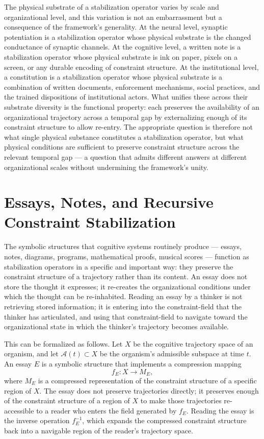 \documentclass[12pt,a4paper]{report}
\theoremstyle{flyxion}
\begin{document}
The physical substrate of a stabilization operator varies by scale and organizational level, and this variation is not an embarrassment but a consequence of the framework's generality. At the neural level, synaptic potentiation is a stabilization operator whose physical substrate is the changed conductance of synaptic channels. At the cognitive level, a written note is a stabilization operator whose physical substrate is ink on paper, pixels on a screen, or any durable encoding of constraint structure. At the institutional level, a constitution is a stabilization operator whose physical substrate is a combination of written documents, enforcement mechanisms, social practices, and the trained dispositions of institutional actors. What unifies these across their substrate diversity is the functional property: each preserves the availability of an organizational trajectory across a temporal gap by externalizing enough of its constraint structure to allow re-entry. The appropriate question is therefore not what single physical substance constitutes a stabilization operator, but what physical conditions are sufficient to preserve constraint structure across the relevant temporal gap --- a question that admits different answers at different organizational scales without undermining the framework's unity.

\section{Essays, Notes, and Recursive Constraint Stabilization}

The symbolic structures that cognitive systems routinely produce --- essays, notes, diagrams, programs, mathematical proofs, musical scores --- function as stabilization operators in a specific and important way: they preserve the constraint structure of a trajectory rather than its content. An essay does not store the thought it expresses; it re-creates the organizational conditions under which the thought can be re-inhabited. Reading an essay by a thinker is not retrieving stored information; it is entering into the constraint-field that the thinker has articulated, and using that constraint-field to navigate toward the organizational state in which the thinker's trajectory becomes available.

This can be formalized as follows. Let $X$ be the cognitive trajectory space of an organism, and let $\mathcal{A}(t) \subset X$ be the organism's admissible subspace at time $t$. An essay $E$ is a symbolic structure that implements a compression mapping
\[
f_E : X \rightarrow M_E,
\]
where $M_E$ is a compressed representation of the constraint structure of a specific region of $X$. The essay does not preserve trajectories directly; it preserves enough of the constraint structure of a region of $X$ to make those trajectories re-accessible to a reader who enters the field generated by $f_E$. Reading the essay is the inverse operation $f_E^{-1}$, which expands the compressed constraint structure back into a navigable region of the reader's trajectory space.
\end{document}
